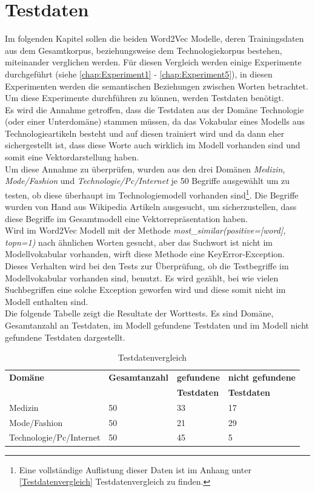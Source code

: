 \documentclass[12pt,a4paper]{report}
\begin{document}
	\section{Testdaten}
Im folgenden Kapitel sollen die beiden Word2Vec Modelle, deren Trainingsdaten aus dem Gesamtkorpus, beziehungsweise dem Technologiekorpus bestehen, miteinander verglichen werden. Für diesen Vergleich werden einige Experimente durchgeführt (siehe \ref{chap:Experiment1} - \ref{chap:Experiment5}), in diesen Experimenten werden die semantischen Beziehungen zwischen Worten betrachtet. Um diese Experimente durchführen zu können, werden Testdaten benötigt.\\
Es wird die Annahme getroffen, dass die Testdaten aus der Domäne Technologie (oder einer Unterdomäne) stammen müssen, da das Vokabular eines Modells aus Technologieartikeln besteht und auf diesen trainiert wird und da dann eher sichergestellt ist, dass diese Worte auch wirklich im Modell vorhanden sind und somit eine Vektordarstellung haben.\\
Um diese Annahme zu überprüfen, wurden aus den drei Domänen \textit{Medizin}, \textit{Mode/Fashion} und \textit{Technologie/Pc/Internet} je 50 Begriffe ausgewählt um zu testen, ob diese überhaupt im Technologiemodell vorhanden sind\footnote{Eine vollständige Auflistung dieser Daten ist im Anhang unter \ref{Testdatenvergleich} Testdatenvergleich zu finden.}. Die Begriffe wurden von Hand aus Wikipedia Artikeln ausgesucht, um sicherzustellen, dass diese Begriffe im Gesamtmodell eine Vektorrepräsentation haben.\\
Wird im Word2Vec Modell mit der Methode \textit{most\_similar(positive=[\grq word\grq], topn=1)} nach ähnlichen Worten gesucht, aber das Suchwort ist nicht im Modellvokabular vorhanden, wirft diese Methode eine \glqq KeyError\grqq -Exception. Dieses Verhalten wird bei den Tests zur Überprüfung, ob die Testbegriffe im Modellvokabular vorhanden sind, benutzt. Es wird gezählt, bei wie vielen Suchbegriffen eine solche Exception geworfen wird und diese somit nicht im Modell enthalten sind.\\

Die folgende Tabelle zeigt die Resultate der Worttests. Es sind Domäne, Gesamtanzahl an Testdaten, im Modell gefundene Testdaten und im Modell nicht gefundene Testdaten dargestellt.

\begin{table}[H]
\caption{Testdatenvergleich}
\begin{center}
\begin{tabular}{|l||l|l|l|}
\hline
\textbf{Domäne} 	& \textbf{Gesamtanzahl} 	& \textbf{gefundene} & \textbf{nicht gefundene} \\
 		&  				& \textbf{Testdaten}	& \textbf{Testdaten} \\

\hline
 Medizin & 50 & 33 & 17\\
 \hline
 Mode/Fashion & 50 & 21 & 29\\
 \hline
 Technologie/Pc/Internet & 50 & 45 & 5\\
 \hline
 
\end{tabular}
\end{center}
\end{table}
\end{document}
